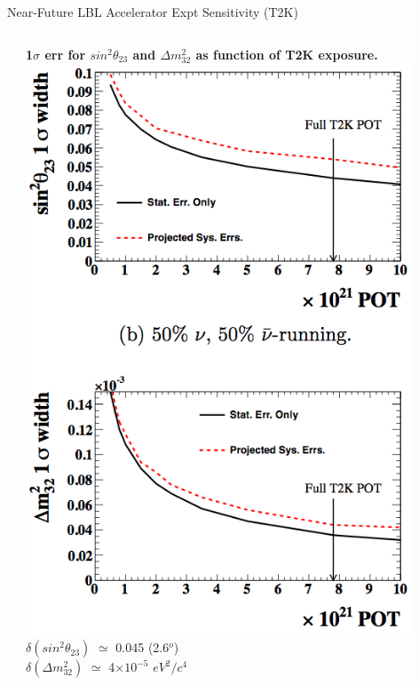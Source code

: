 \begin{frame}{Near-Future LBL Accelerator Expt Sensitivity (T2K)}
\begin{columns}[T]
\begin{column}{0.66\textwidth}
{    }
  \end{column}
  \begin{column}{0.33\textwidth}
    \begin{center}
      {\bf \scriptsize
         1$\sigma$ err for $sin^{2}{\theta}_{23}$ and ${\Delta}m^{2}_{32}$ as function of T2K exposure.\\
      }
      \vspace{0.1cm}
      \includegraphics[width=0.90\textwidth]{./images/3nu/accelerator/future_sensitivity/t2k/disapp_dm_theta23_sigma.png}\\
      {\scriptsize
         ${\delta}(sin^2\theta_{23})$ $\simeq$ 0.045 (2.6$^{o}$)\\
         ${\delta}({\Delta}m^{2}_{32})$ $\simeq$ 4$\times10^{-5}$ $eV^{2}/c^{4}$\\
      }
    \end{center}
  \end{column}
\end{columns}
\end{frame}



